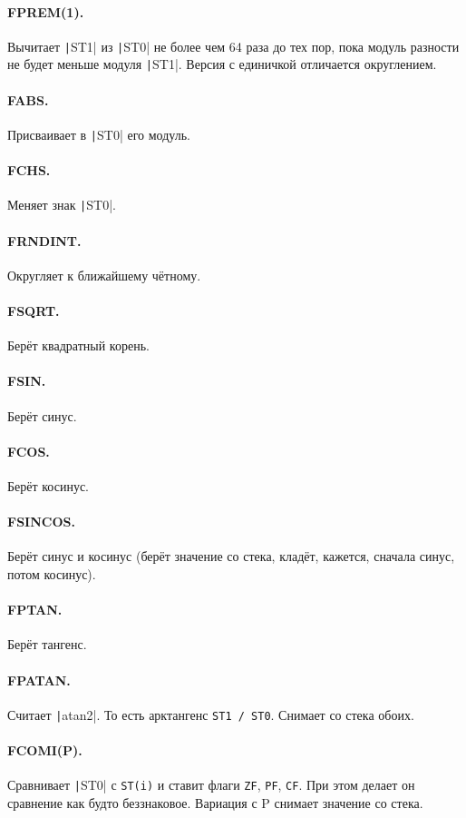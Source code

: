 \documentclass{article}
\begin{document}
    \paragraph{FPREM(1).}
    Вычитает \texttt|ST1| из \texttt|ST0| не более чем 64 раза до тех пор, пока модуль разности не будет меньше модуля \texttt|ST1|. Версия с единичкой отличается округлением.
    \paragraph{FABS.}
    Присваивает в \texttt|ST0| его модуль.
    \paragraph{FCHS.}
    Меняет знак \texttt|ST0|.
    \paragraph{FRNDINT.}
    Округляет к ближайшему чётному.
    \paragraph{FSQRT.}
    Берёт квадратный корень.
    \paragraph{FSIN.}
    Берёт синус.
    \paragraph{FCOS.}
    Берёт косинус.
    \paragraph{FSINCOS.}
    Берёт синус и косинус (берёт значение со стека, кладёт, кажется, сначала синус, потом косинус).
    \paragraph{FPTAN.}
    Берёт тангенс.
    \paragraph{FPATAN.}
    Считает \texttt|atan2|. То есть арктангенс \Verb|ST1 / ST0|. Снимает со стека обоих.
    \paragraph{FCOMI(P).}
    Сравнивает \texttt|ST0| с \Verb|ST(i)| и ставит флаги \Verb|ZF|, \Verb|PF|, \Verb|CF|. При этом делает он сравнение как будто беззнаковое. Вариация с P снимает значение со стека.
\end{document}
